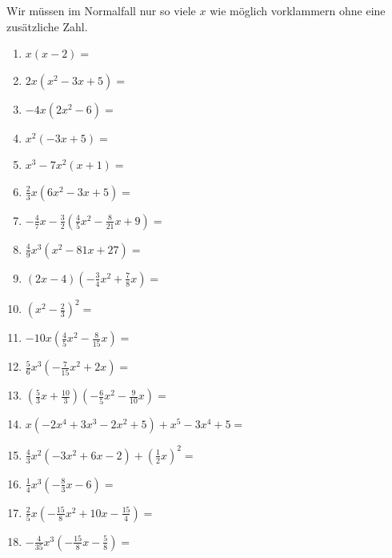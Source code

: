 Wir müssen im Normalfall nur so viele \(x\) wie möglich vorklammern ohne eine zusätzliche Zahl.
\newpage
\begin{Exercise}[title={Löse die Klammern auf und fasse soweit wie möglich zusammen}, label=aufloesenA1]

	\begin{minipage}{\textwidth}
		\begin{minipage}{0.46\textwidth}
			\begin{enumerate}[label=\alph*)]
				\item \(x\left( x-2\right) =\)
				\item \(2x\left( x^2-3x+5\right) =\)
				\item \(-4x\left( 2x^2-6\right) =\)
				\item \(x^2\left( -3x+5\right) =\)
				\item \(x^3-7x^2\left( x+1\right) =\)
				\item \(\frac{2}{3}x\left(6x^2-3x+5\right) =\)
				\item \(-\frac{4}{7}x-\frac{3}{2}\left(\frac{4}{5}x^2-\frac{8}{21}x+9\right) =\)
				\item \(\frac{4}{9}x^3\left(x^2-81x+27\right) =\)
				\item \(\left(2x-4\right) \left(-\frac{3}{4}x^2+\frac{7}{8}x\right) =\)
				\item \(\left(x^2-\frac{2}{3}\right) ^2=\)
				\item \(-10x\left(\frac{4}{5}x^2-\frac{8}{15}x\right) =\)
				\item \(\frac{5}{6}x^3\left(-\frac{7}{15}x^2+2x\right) =\)
				\item \(\left(\frac{5}{3}x+\frac{10}{3}\right)\left(-\frac{6}{5}x^2-\frac{9}{10}x \right) =\)
			\end{enumerate}
		\end{minipage}%
		\begin{minipage}{0.54\textwidth}
			\begin{enumerate}[label=\alph*)]
				\setcounter{enumi}{13}
				\item \(x\left(-2x^4+3x^3-2x^2+5 \right)+x^5-3x^4+5 =\)
				\item \(\frac{4}{3}x^2\left( -3x^2+6x-2\right) +\left( \frac{1}{2}x\right) ^2=\)
				\item \(\frac{1}{4}x^3\left(-\frac{8}{3}x-6 \right) =\)
				\item \(\frac{2}{5}x\left(-\frac{15}{8}x^2+10x-\frac{15}{4} \right) =\)
				\item \(-\frac{4}{35}x^3\left(-\frac{15}{8}x- \frac{5}{8}\right) =\)

\end{enumerate}
\end{minipage}
\end{minipage}
\end{Exercise}
